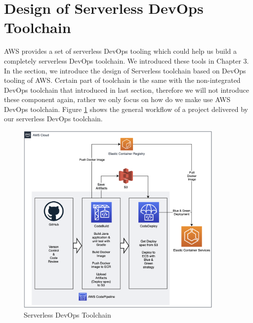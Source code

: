 \section{Design of Serverless DevOps Toolchain}
AWS provides a set of serverless DevOps tooling which could help us build a completely serverless DevOps toolchain. We introduced these tools in Chapter 3. In the section, we introduce the design of Serverless toolchain based on DevOps tooling of AWS. Certain part of toolchain is the same with the non-integrated DevOps toolchain that introduced in last section, therefore we will not introduce these component again, rather we only focus on how do we make use AWS DevOps toolchain. Figure \ref{fig:codepipeline} shows the general workflow of a project delivered by our serverless DevOps toolchain.
\begin{figure}[h]
    \centering
    \includegraphics[width=0.90\textwidth]{pics/codepipeline.png}
    \caption{Serverless DevOps Toolchain}
    \label{fig:codepipeline}
\end{figure}
